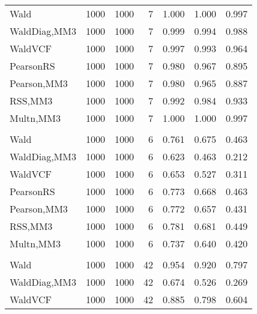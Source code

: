 \documentclass[
]{article}
\begin{document}
\begin{table}[H]
{\begin{tabular}[t]{lrrrrrr}
\hspace{1em}Wald & 1000 & 1000 & 7 & 1.000 & 1.000 & 0.997\\
\hspace{1em}WaldDiag,MM3 & 1000 & 1000 & 7 & 0.999 & 0.994 & 0.988\\
\hspace{1em}WaldVCF & 1000 & 1000 & 7 & 0.997 & 0.993 & 0.964\\
\hspace{1em}PearsonRS & 1000 & 1000 & 7 & 0.980 & 0.967 & 0.895\\
\hspace{1em}Pearson,MM3 & 1000 & 1000 & 7 & 0.980 & 0.965 & 0.887\\
\hspace{1em}RSS,MM3 & 1000 & 1000 & 7 & 0.992 & 0.984 & 0.933\\
\hspace{1em}Multn,MM3 & 1000 & 1000 & 7 & 1.000 & 1.000 & 0.997\\
\addlinespace[0.3em]
\multicolumn{7}{l}{\textbf{2F 10V}}\\
\hspace{1em}Wald & 1000 & 1000 & 6 & 0.761 & 0.675 & 0.463\\
\hspace{1em}WaldDiag,MM3 & 1000 & 1000 & 6 & 0.623 & 0.463 & 0.212\\
\hspace{1em}WaldVCF & 1000 & 1000 & 6 & 0.653 & 0.527 & 0.311\\
\hspace{1em}PearsonRS & 1000 & 1000 & 6 & 0.773 & 0.668 & 0.463\\
\hspace{1em}Pearson,MM3 & 1000 & 1000 & 6 & 0.772 & 0.657 & 0.431\\
\hspace{1em}RSS,MM3 & 1000 & 1000 & 6 & 0.781 & 0.681 & 0.449\\
\hspace{1em}Multn,MM3 & 1000 & 1000 & 6 & 0.737 & 0.640 & 0.420\\
\addlinespace[0.3em]
\multicolumn{7}{l}{\textbf{3F 15V}}\\
\hspace{1em}Wald & 1000 & 1000 & 42 & 0.954 & 0.920 & 0.797\\
\hspace{1em}WaldDiag,MM3 & 1000 & 1000 & 42 & 0.674 & 0.526 & 0.269\\
\hspace{1em}WaldVCF & 1000 & 1000 & 42 & 0.885 & 0.798 & 0.604\\

\end{tabular}}
\end{table}
\end{document}
